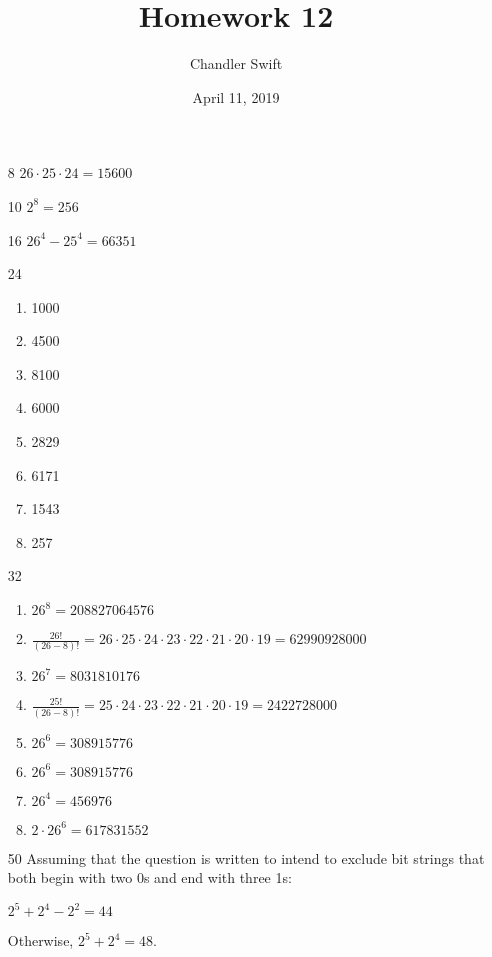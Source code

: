 \documentclass{article}
\title{Homework 12}
\author{Chandler Swift}
\date{April 11, 2019}
\begin{document}
\maketitle
\begin{enumerate}
  \item[8] $26\cdot25\cdot24=15600$
  \item[10] $2^8=256$
  \item[16] $26^4-25^4 = 66351$
  \item[24]
    \begin{enumerate}
      \item 1000
      \item 4500
      \item 8100
      \item 6000
      \item 2829
      \item 6171
      \item 1543
      \item 257
    \end{enumerate}
  \item[32]
    \begin{enumerate}
      \item $26^8 = 208827064576$
      \item $\frac{26!}{(26-8)!} = 26 \cdot 25 \cdot 24 \cdot 23 \cdot 22
        \cdot 21 \cdot 20 \cdot 19 = 62990928000$
      \item $26^7 = 8031810176$
      \item $\frac{25!}{(26-8)!} = 25 \cdot 24 \cdot 23 \cdot 22
        \cdot 21 \cdot 20 \cdot 19 = 2422728000$
      \item $26^6 = 308915776$
      \item $26^6 = 308915776$
      \item $26^4 = 456976$
      \item $2 \cdot 26^6 = 617831552$
    \end{enumerate}
  \item[50] Assuming that the question is written to intend to exclude bit
    strings that both begin with two 0s and end with three 1s:

    $2^5  + 2^4 - 2^2 = 44$

    Otherwise, $2^5 + 2^4 = 48$.
\end{enumerate}
\end{document}
